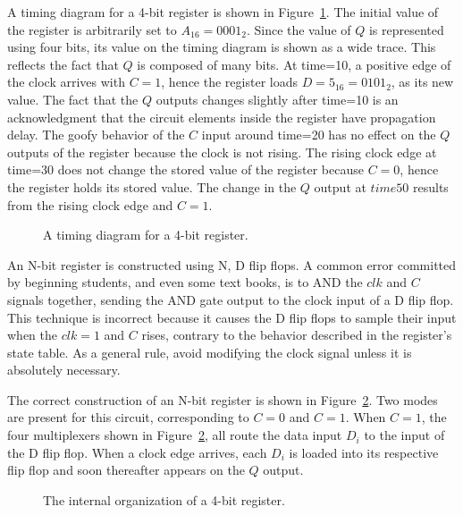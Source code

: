 A timing diagram for a 4-bit register is shown in Figure~\ref{fig:sequentialBBRegTime}.
The initial value of the register is arbitrarily set to $A_{16}=0001_2$.  
Since the value of $Q$ is represented using four bits, its value on the timing
diagram is shown as a wide trace.  This reflects the fact that $Q$ is 
composed of many bits.  At time=10, a positive edge of the clock arrives
with $C=1$, hence the register loads $D=5_{16}=0101_2$, as its new value.  
The fact that the $Q$ outputs changes slightly after time=10 is an 
acknowledgment that the circuit elements inside the register have 
propagation delay.  The goofy behavior of the $C$ input around time=20 has
no effect on the $Q$ outputs of the register because the clock is not rising.
The rising clock edge at time=30 does not change the stored value of the 
register because $C=0$, hence the register holds its stored value.  The change
in the $Q$ output at $time 50$ results from the rising clock edge and $C=1$.

\begin{figure}[ht]
\caption{A timing diagram for a 4-bit register.}
\label{fig:sequentialBBRegTime}
\end{figure}

An N-bit register is constructed using N, D flip flops.  A common error
committed by beginning students, and even some text books, is to AND the 
$clk$ and $C$ signals together, sending the AND gate output to the 
clock input of a D flip
flop.  This technique is incorrect because it causes the D flip flops to 
sample their input when the $clk = 1$ and $C$ rises, contrary to the behavior
described in the register's state table.  As a general rule, 
avoid modifying the clock signal unless it is absolutely necessary.

The correct construction of an N-bit register is shown in 
Figure~\ref{fig:sequentialBBreg}.   Two modes are present for this circuit, 
corresponding to $C=0$ and $C=1$.  When $C=1$, the four multiplexers 
shown in Figure~\ref{fig:sequentialBBreg}, all route the data input $D_i$ 
to the input of the D flip flop.  When a clock edge arrives,
each $D_i$ is loaded into its respective flip flop and
soon thereafter appears on the $Q$ output. 

\begin{figure}[ht]
\caption{The internal organization of a 4-bit register.}
\label{fig:sequentialBBreg}
\end{figure}

